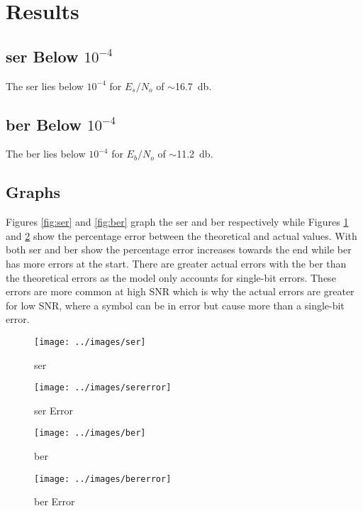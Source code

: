 \documentclass[A4, 12pt]{article}
\begin{document}
\section{Results}

\subsection{\ac{ser} Below $10^{-4}$}
The \ac{ser} lies below $10^{-4}$ for $E_s/N_o$ of $\sim$\SI{16.7}{\decibel}.

\subsection{\ac{ber} Below $10^{-4}$}
The \ac{ber} lies below $10^{-4}$ for $E_b/N_o$ of $\sim$\SI{11.2}{\decibel}.

\subsection{Graphs}
Figures \ref{fig:ser} and \ref{fig:ber} graph the \ac{ser} and \ac{ber} respectively while Figures \ref{fig:sererror} and \ref{fig:bererror} show the percentage error between the theoretical and actual values.
With both \ac{ser} and \ac{ber} show the percentage error increases towards the end while \ac{ber} has more errors at the start. 
There are greater actual errors with the \ac{ber} than the theoretical errors as the model only accounts for single-bit errors.
These errors are more common at high SNR which is why the actual errors are greater for low SNR, where a symbol can be in error but cause more than a single-bit error.

\begin{figure}[H]
	\centering
	\begin{minipage}{.4\textwidth}
		\centering
		\texttt{[image: ../images/ser]}
		\caption{\ac{ser}}
		\label{fig:ser}
	\end{minipage}
	\begin{minipage}{.4\textwidth}
		\centering
		\texttt{[image: ../images/sererror]}
		\caption{\ac{ser} Error}
		\label{fig:sererror}
	\end{minipage}
\end{figure}

\begin{figure}[H]
	\centering
	\begin{minipage}{.4\textwidth}
		\centering
		\texttt{[image: ../images/ber]}
		\caption{\ac{ber}}
		\label{fig:ber}
	\end{minipage}
	\begin{minipage}{.4\textwidth}
		\centering
		\texttt{[image: ../images/bererror]}
		\caption{\ac{ber} Error}
		\label{fig:bererror}
	\end{minipage}
\end{figure}
\end{document}

